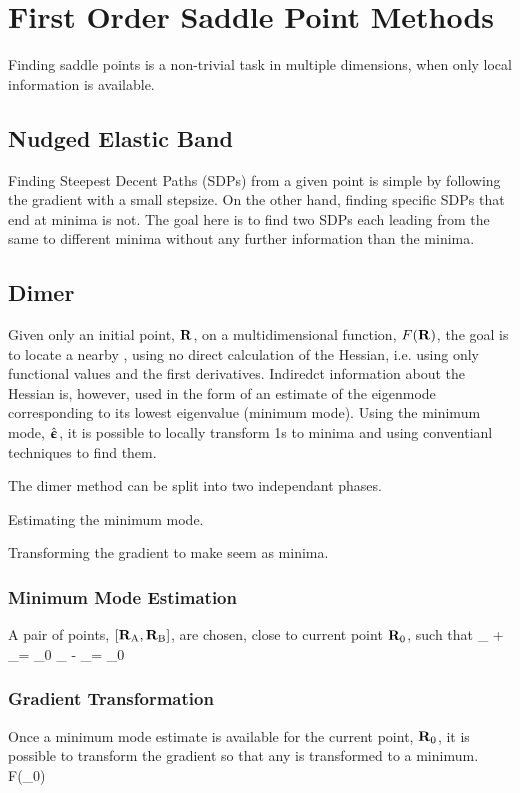 \section{First Order Saddle Point Methods}
\label{sec:sps}

Finding saddle points is a non-trivial task in multiple dimensions, when only local information is available.

\incomplete

\subsection{Nudged Elastic Band}
\label{sec:neb}

Finding Steepest Decent Paths (SDPs) from a given point is simple by following the gradient with a small stepsize.
On the other hand, finding specific SDPs that end at minima is not.
The goal here is to find two SDPs each leading from the same  to different minima without any further information than the minima.


\incomplete

\subsection{Dimer}
\label{sec:dimer}

Given only an initial point, ${\mathrm{\mathbf{\bm{R}}}}$, on a multidimensional function, $F({\mathrm{\mathbf{\bm{R}}}})$, the goal is to locate a nearby , using no direct calculation of the Hessian, i.e. using only functional values and the first derivatives.
Indiredct information about the Hessian is, however, used in the form of an estimate of the eigenmode corresponding to its lowest eigenvalue (minimum mode).
Using the minimum mode, $\hat{{\mathrm{\mathbf{\bm{\upepsilon}}}}}$, it is possible to locally transform \sap1s to minima and using conventianl techniques to find them.

The dimer method can be split into two independant phases.
\item Estimating the minimum mode.
\item Transforming the gradient to make  seem as minima.
\een

\subsubsection{Minimum Mode Estimation}
A pair of points, $[{\mathrm{\mathbf{\bm{R}}}}_\text{A}, {\mathrm{\mathbf{\bm{R}}}}_\text{B}]$, are chosen, close to current point ${\mathrm{\mathbf{\bm{R}}}}_0$, such that
\vR_ + \partial_\uvn = \vR_0 \quad {} \quad \vR_ - \partial_\uvn = \vR_0
\eeq

\subsubsection{Gradient Transformation}
Once a minimum mode estimate is available for the current point, ${\mathrm{\mathbf{\bm{R}}}}_0$, it is possible to transform the gradient so that any  is transformed to a minimum.
\nabla{}F(\vR_0)
\eeq




\incomplete

